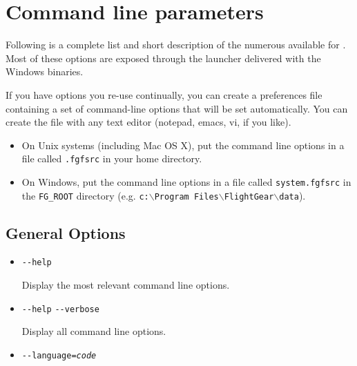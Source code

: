 {%
\section{Command line parameters\label{options}}
Following is a complete list and short description of the numerous 
available for \FlightGear{}. Most of these options are exposed through the \FlightGear{} launcher delivered with the
Windows binaries.

If you have options you re-use continually, you can create a preferences file
containing a set of command-line options that will be set automatically. You
can create the file with any text editor (notepad, emacs, vi, if you like).

\begin{itemize}
\item On Unix systems (including Mac OS X), put the command line options in a
file called \texttt{.fgfsrc} in your home directory.

\item On Windows, put the command line options in a file called \texttt{system.fgfsrc}
 in the \texttt{FG\_ROOT} directory (e.g. \texttt{c:$\backslash$Program Files$\backslash$FlightGear$\backslash$data}).
\end{itemize}

\subsection{General Options}\label{generaloptions}
\begin{itemize}
\item{\texttt{-$ $-help}}

  Display the most relevant command line options.

\item{\texttt{-$ $-help} \texttt{-$ $-verbose}}

  Display all command line options.

\item{\texttt{-$ $-language={\it code}}}


\end{itemize}}
